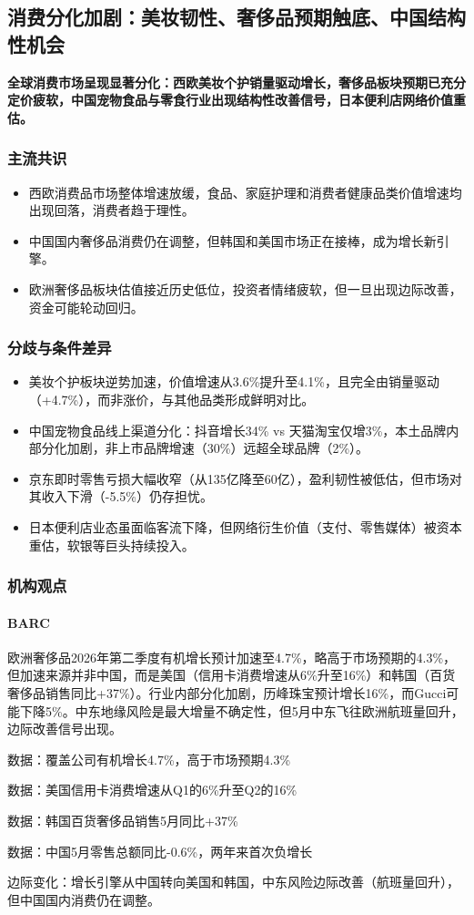 \documentclass[11pt]{ctexart}
\begin{document}
\subsection{消费分化加剧：美妆韧性、奢侈品预期触底、中国结构性机会}
\textbf{全球消费市场呈现显著分化：西欧美妆个护销量驱动增长，奢侈品板块预期已充分定价疲软，中国宠物食品与零食行业出现结构性改善信号，日本便利店网络价值重估。}
\subsubsection*{主流共识}
\begin{itemize}
  \item 西欧消费品市场整体增速放缓，食品、家庭护理和消费者健康品类价值增速均出现回落，消费者趋于理性。
  \item 中国国内奢侈品消费仍在调整，但韩国和美国市场正在接棒，成为增长新引擎。
  \item 欧洲奢侈品板块估值接近历史低位，投资者情绪疲软，但一旦出现边际改善，资金可能轮动回归。
\end{itemize}
\subsubsection*{分歧与条件差异}
\begin{itemize}
  \item 美妆个护板块逆势加速，价值增速从3.6\%提升至4.1\%，且完全由销量驱动（+4.7\%），而非涨价，与其他品类形成鲜明对比。
  \item 中国宠物食品线上渠道分化：抖音增长34\% vs 天猫淘宝仅增3\%，本土品牌内部分化加剧，非上市品牌增速（30\%）远超全球品牌（2\%）。
  \item 京东即时零售亏损大幅收窄（从135亿降至60亿），盈利韧性被低估，但市场对其收入下滑（-5.5\%）仍存担忧。
  \item 日本便利店业态虽面临客流下降，但网络衍生价值（支付、零售媒体）被资本重估，软银等巨头持续投入。
\end{itemize}
\subsubsection*{机构观点}
\paragraph{BARC} 欧洲奢侈品2026年第二季度有机增长预计加速至4.7\%，略高于市场预期的4.3\%，但加速来源并非中国，而是美国（信用卡消费增速从6\%升至16\%）和韩国（百货奢侈品销售同比+37\%）。行业内部分化加剧，历峰珠宝预计增长16\%，而Gucci可能下降5\%。中东地缘风险是最大增量不确定性，但5月中东飞往欧洲航班量回升，边际改善信号出现。
{\small\color{refgray}数据：覆盖公司有机增长4.7\%，高于市场预期4.3\%\par}
{\small\color{refgray}数据：美国信用卡消费增速从Q1的6\%升至Q2的16\%\par}
{\small\color{refgray}数据：韩国百货奢侈品销售5月同比+37\%\par}
{\small\color{refgray}数据：中国5月零售总额同比-0.6\%，两年来首次负增长\par}
{\small\color{refgray}边际变化：增长引擎从中国转向美国和韩国，中东风险边际改善（航班量回升），但中国国内消费仍在调整。\par}
\end{document}
